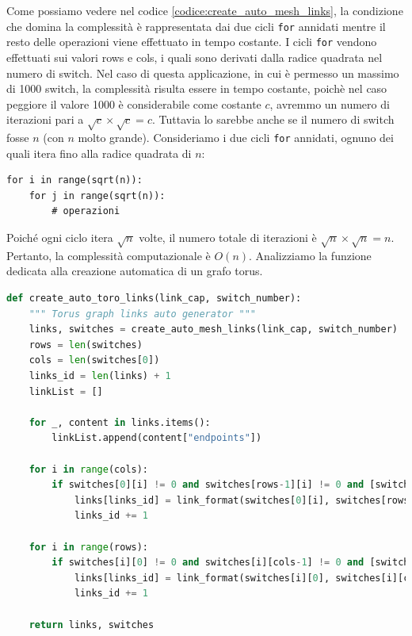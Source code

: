 \documentclass[binding=0.6cm]{sapthesis}
\begin{document}
Come possiamo vedere nel codice \ref{codice:create_auto_mesh_links}, la condizione che domina la complessità è rappresentata dai due cicli \texttt{for} annidati mentre il resto delle
operazioni viene effettuato in tempo costante. I cicli \texttt{for} vendono effettuati sui valori rows e cols, i quali sono derivati dalla radice quadrata nel numero di switch. 
Nel caso di questa applicazione, in cui è permesso un massimo di 1000 switch, la complessità risulta essere in tempo costante, 
poichè nel caso peggiore il valore 1000 è considerabile come costante \(c\), 
avremmo un numero di iterazioni pari a  \( \sqrt{c} \times \sqrt{c} = c \).
Tuttavia lo sarebbe anche se il numero di switch fosse \(n\) 
(con \(n\) molto grande). Consideriamo i due cicli \texttt{for} annidati, ognuno dei quali itera fino alla radice quadrata di \( n \):
\begin{verbatim}
for i in range(sqrt(n)):
    for j in range(sqrt(n)):
        # operazioni
\end{verbatim}
Poiché ogni ciclo itera \( \sqrt{n} \) volte, il numero totale di iterazioni è \( \sqrt{n} \times \sqrt{n} = n \). Pertanto, la complessità computazionale è \( O(n) \).
Analizziamo la funzione dedicata alla creazione automatica di un grafo torus.

{\scriptsize %
\begin{lstlisting}[language=Python, basicstyle=\ttfamily, caption={funzione per la creazione automatica di un grafo torus}, label={codice:create_auto_torus_links}, breaklines=true]
    def create_auto_toro_links(link_cap, switch_number):
    """ Torus graph links auto generator """
    links, switches = create_auto_mesh_links(link_cap, switch_number)
    rows = len(switches)
    cols = len(switches[0])
    links_id = len(links) + 1
    linkList = []

    for _, content in links.items():
        linkList.append(content["endpoints"])
    
    for i in range(cols):
        if switches[0][i] != 0 and switches[rows-1][i] != 0 and [switches[0][i],switches[rows-1][i]] not in linkList:
            links[links_id] = link_format(switches[0][i], switches[rows-1][i], link_cap)
            links_id += 1

    for i in range(rows):
        if switches[i][0] != 0 and switches[i][cols-1] != 0 and [switches[i][0], switches[i][cols-1]] not in linkList:
            links[links_id] = link_format(switches[i][0], switches[i][cols-1], link_cap)
            links_id += 1

    return links, switches
\end{lstlisting}
} %
\end{document}
